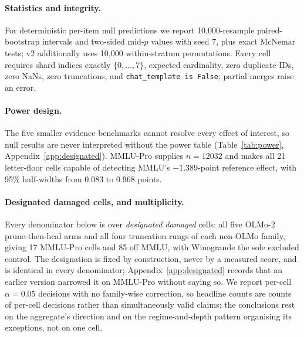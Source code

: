 \paragraph{Statistics and integrity.}
For deterministic per-item null predictions we report 10,000-resample paired-bootstrap intervals and two-sided mid-$p$ values with seed 7, plus exact McNemar tests; v2 additionally uses 10,000 within-stratum permutations. Every cell requires shard indices exactly $\{0,\ldots,7\}$, expected cardinality, zero duplicate IDs, zero NaNs, zero truncations, and \texttt{chat\_template is False}; partial merges raise an error.

\paragraph{Power design.}
The five smaller evidence benchmarks cannot resolve every effect of interest, so null results are never interpreted without the power table (Table~\ref{tab:power}, Appendix~\ref{app:designated}).
MMLU-Pro supplies $n=12032$ and makes all 21 letter-floor cells capable of detecting MMLU's $-1.389$-point reference effect, with 95\% half-widths from 0.083 to 0.968 points.

\paragraph{Designated damaged cells, and multiplicity.}
Every denominator below is over \emph{designated damaged} cells: all five OLMo-2 prune-then-heal arms and all four truncation rungs of each non-OLMo family, giving 17 MMLU-Pro cells and 85 off MMLU, with Winogrande the sole excluded control. The designation is fixed by construction, never by a measured score, and is identical in every denominator; Appendix~\ref{app:designated} records that an earlier version narrowed it on MMLU-Pro without saying so. We report per-cell $\alpha=0.05$ decisions with no family-wise correction, so headline counts are counts of per-cell decisions rather than simultaneously valid claims; the conclusions rest on the aggregate's direction and on the regime-and-depth pattern organising its exceptions, not on one cell.
